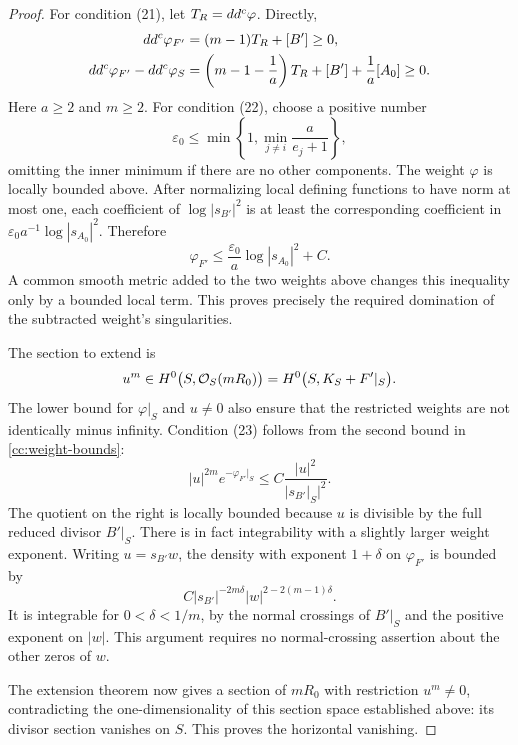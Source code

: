 \begin{proof}
For condition (21), let $T_R=dd^c\varphi$.  Directly,
\begin{equation}
 \begin{split}
 dd^c\varphi_{F'}&=(m-1)T_R+[B']\ge0,\\
 dd^c\varphi_{F'}-dd^c\varphi_S
       &=\left(m-1-\frac1a\right)T_R+[B']+\frac1a[A_0]\ge0.
 \end{split}
\label{cc:extension-curvature}
\end{equation}
Here $a\ge2$ and $m\ge2$.  For condition (22), choose a positive
number
\[
  \varepsilon_0\le
       \min\left\{1,\min_{j\ne i}\frac{a}{e_j+1}\right\},
\]
omitting the inner minimum if there are no other components.  The
weight $\varphi$ is locally bounded above.  After normalizing local
defining functions to have norm at most one, each coefficient of
$\log|s_{B'}|^2$ is at least the corresponding coefficient in
$\varepsilon_0 a^{-1}\log|s_{A_0}|^2$.  Therefore
\[
       \varphi_{F'}\le
             \frac{\varepsilon_0}{a}\log|s_{A_0}|^2+C.
\]
A common smooth metric added to the two weights above changes this
inequality only by a bounded local term.  This proves precisely the
required domination of the subtracted weight's singularities.

The section to extend is
\[
       u^m\in H^0\bigl(S,\mathcal O_S(mR_0)\bigr)
             =H^0\bigl(S,K_S+F'|_S\bigr).
\]
The lower bound for $\varphi|_S$ and $u\ne0$ also ensure that
the restricted weights are not identically minus infinity.
Condition (23) follows from the second bound in
\eqref{cc:weight-bounds}:
\begin{equation}
 |u|^{2m}e^{-\varphi_{F'}|_S}
                \le C\frac{|u|^2}{|s_{B'}|_S|^2}.
\label{cc:extension-integral}
\end{equation}
The quotient on the right is locally bounded because $u$ is divisible
by the full reduced divisor $B'|_S$.  There is in fact integrability
with a slightly larger weight exponent.  Writing $u=s_{B'}w$, the
density with exponent $1+\delta$ on $\varphi_{F'}$ is bounded by
\[
 C|s_{B'}|^{-2m\delta}|w|^{2-2(m-1)\delta}.
\]
It is integrable for $0<\delta<1/m$, by the normal crossings of
$B'|_S$ and the positive exponent on $|w|$.  This argument requires no
normal-crossing assertion about the other zeros of $w$.

The extension theorem now gives a section of $mR_0$ with restriction
$u^m\ne0$, contradicting the one-dimensionality of this section
space established above: its divisor section vanishes on $S$.
This proves the horizontal vanishing.


\end{proof}
